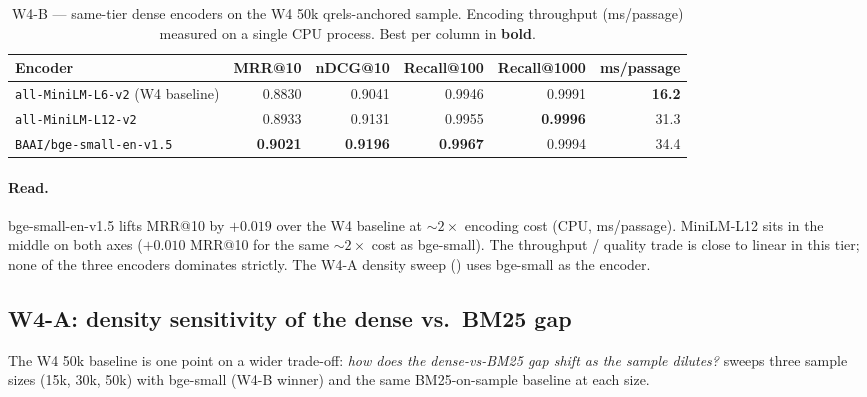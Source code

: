 \documentclass[11pt,a4paper]{article}
\makeatletter
\newcommand{\mrr}{MRR@10}
\newcommand{\ndcg}{nDCG@10}
\newcommand{\recallH}{Recall@100}
\newcommand{\recallK}{Recall@1000}
\newcommand{\bmtwofive}{BM25}
\makeatother
\begin{document}
\begin{table}[H]
  \centering
  \caption{W4-B --- same-tier dense encoders on the W4 50k
  qrels-anchored sample.  Encoding throughput (ms/passage) measured
  on a single CPU process. Best per column in \textbf{bold}.}
  \label{tab:w4b-encoders}
  \begin{tabular}{lrrrrr}
    \toprule
    Encoder & \mrr{} & \ndcg{} & \recallH{} & \recallK{} & ms/passage \\
    \midrule
    \texttt{all-MiniLM-L6-v2} (W4 baseline) & 0.8830 & 0.9041 & 0.9946 & 0.9991 & \textbf{16.2} \\
    \texttt{all-MiniLM-L12-v2}              & 0.8933 & 0.9131 & 0.9955 & \textbf{0.9996} & 31.3 \\
    \texttt{BAAI/bge-small-en-v1.5}         & \textbf{0.9021} & \textbf{0.9196} & \textbf{0.9967} & 0.9994 & 34.4 \\
    \bottomrule
  \end{tabular}
\end{table}

\paragraph{Read.}  bge-small-en-v1.5 lifts \mrr{} by $+0.019$ over
the W4 baseline at $\sim\!2\!\times$ encoding cost (CPU,
ms/passage).  MiniLM-L12 sits in the middle on both axes
($+0.010$ \mrr{} for the same $\sim\!2\!\times$ cost as bge-small).
The throughput / quality trade is close to linear in this tier;
none of the three encoders dominates strictly.  The W4-A density
sweep () uses bge-small as the encoder.

\subsection{W4-A: density sensitivity of the dense vs.\ \bmtwofive{} gap}
\label{sec:w4a}

The W4 50k baseline is one point on a wider trade-off:
\emph{how does the dense-vs-\bmtwofive{} gap shift as the sample
dilutes?}   sweeps three sample sizes (15k,
30k, 50k) with bge-small (W4-B winner) and the same BM25-on-sample
baseline at each size.
\end{document}
